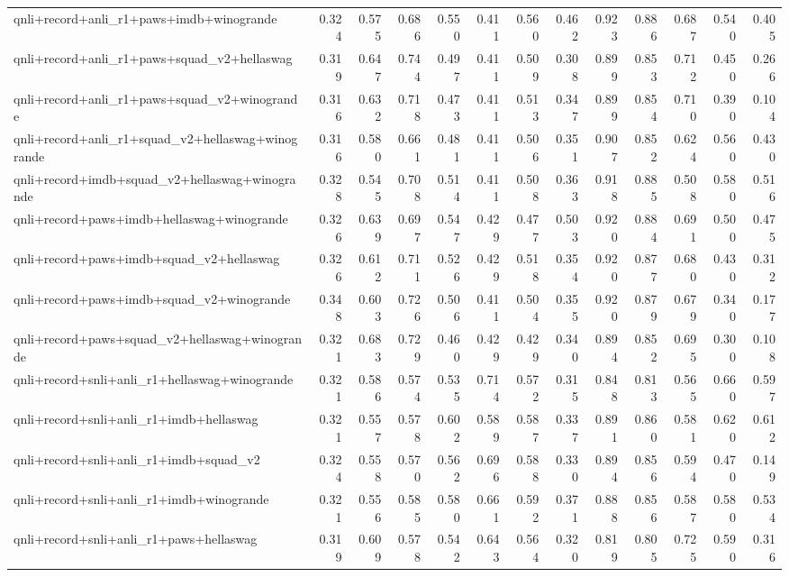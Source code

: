 \begin{table}[t]
\begin{tabular}{lrrrrrrrrrrrr}
    qnli+record+anli\_r1+paws+imdb+winogrande & 0.324 & 0.575 & 0.686 & 0.550 & 0.411 & 0.560 & 0.462 & 0.923 & 0.886 & 0.687 & 0.540 & 0.405 \\
    qnli+record+anli\_r1+paws+squad\_v2+hellaswag & 0.319 & 0.647 & 0.744 & 0.497 & 0.411 & 0.509 & 0.308 & 0.899 & 0.853 & 0.712 & 0.450 & 0.266 \\
    qnli+record+anli\_r1+paws+squad\_v2+winogrande & 0.316 & 0.632 & 0.718 & 0.473 & 0.411 & 0.513 & 0.347 & 0.899 & 0.854 & 0.710 & 0.390 & 0.104 \\
    qnli+record+anli\_r1+squad\_v2+hellaswag+winogrande & 0.316 & 0.580 & 0.661 & 0.481 & 0.411 & 0.506 & 0.351 & 0.907 & 0.852 & 0.624 & 0.560 & 0.430 \\
    qnli+record+imdb+squad\_v2+hellaswag+winogrande & 0.328 & 0.545 & 0.708 & 0.514 & 0.411 & 0.508 & 0.363 & 0.918 & 0.885 & 0.508 & 0.580 & 0.516 \\
    qnli+record+paws+imdb+hellaswag+winogrande & 0.326 & 0.639 & 0.697 & 0.547 & 0.429 & 0.477 & 0.503 & 0.920 & 0.884 & 0.691 & 0.500 & 0.475 \\
    qnli+record+paws+imdb+squad\_v2+hellaswag & 0.326 & 0.612 & 0.711 & 0.526 & 0.429 & 0.518 & 0.354 & 0.920 & 0.877 & 0.680 & 0.430 & 0.312 \\
    qnli+record+paws+imdb+squad\_v2+winogrande & 0.348 & 0.603 & 0.726 & 0.506 & 0.411 & 0.504 & 0.355 & 0.920 & 0.879 & 0.679 & 0.340 & 0.177 \\
    qnli+record+paws+squad\_v2+hellaswag+winogrande & 0.321 & 0.683 & 0.729 & 0.460 & 0.429 & 0.429 & 0.340 & 0.894 & 0.852 & 0.695 & 0.300 & 0.108 \\
    qnli+record+snli+anli\_r1+hellaswag+winogrande & 0.321 & 0.586 & 0.574 & 0.535 & 0.714 & 0.572 & 0.315 & 0.848 & 0.813 & 0.565 & 0.660 & 0.597 \\
    qnli+record+snli+anli\_r1+imdb+hellaswag & 0.321 & 0.557 & 0.578 & 0.602 & 0.589 & 0.587 & 0.337 & 0.891 & 0.860 & 0.581 & 0.620 & 0.612 \\
    qnli+record+snli+anli\_r1+imdb+squad\_v2 & 0.324 & 0.558 & 0.570 & 0.562 & 0.696 & 0.588 & 0.330 & 0.894 & 0.856 & 0.594 & 0.470 & 0.149 \\
    qnli+record+snli+anli\_r1+imdb+winogrande & 0.321 & 0.556 & 0.585 & 0.580 & 0.661 & 0.592 & 0.371 & 0.888 & 0.856 & 0.587 & 0.580 & 0.534 \\
    qnli+record+snli+anli\_r1+paws+hellaswag & 0.319 & 0.609 & 0.578 & 0.542 & 0.643 & 0.564 & 0.320 & 0.819 & 0.805 & 0.725 & 0.590 & 0.316 \\

\end{tabular}
\end{table}
